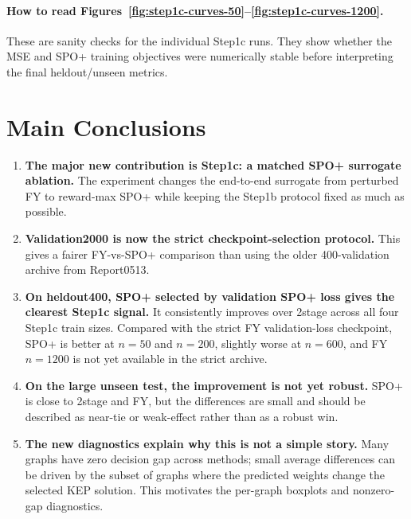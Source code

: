 \documentclass[11pt]{article}
\begin{document}
\paragraph{How to read Figures~\ref{fig:step1c-curves-50}--\ref{fig:step1c-curves-1200}.}
These are sanity checks for the individual Step1c runs. They show whether the
MSE and SPO+ training objectives were numerically stable before interpreting the
final heldout/unseen metrics.

\FloatBarrier
\section{Main Conclusions}

\begin{enumerate}[label=\textbf{C\arabic*.}, leftmargin=2.2em]
    \item \textbf{The major new contribution is Step1c: a matched SPO+ surrogate
    ablation.}  The experiment changes the end-to-end surrogate from perturbed
    FY to reward-max SPO+ while keeping the Step1b protocol fixed as much as
    possible.

    \item \textbf{Validation2000 is now the strict checkpoint-selection
    protocol.}  This gives a fairer FY-vs-SPO+ comparison than using the older
    400-validation archive from Report0513.

    \item \textbf{On heldout400, SPO+ selected by validation SPO+ loss gives the
    clearest Step1c signal.}  It consistently improves over 2stage across all
    four Step1c train sizes. Compared with the strict FY validation-loss
    checkpoint, SPO+ is better at \(n=50\) and \(n=200\), slightly worse at
    \(n=600\), and FY \(n=1200\) is not yet available in the strict archive.

    \item \textbf{On the large unseen test, the improvement is not yet robust.}  SPO+ is
    close to 2stage and FY, but the differences are small and should be
    described as near-tie or weak-effect rather than as a robust win.

    \item \textbf{The new diagnostics explain why this is not a simple story.}
    Many graphs have zero decision gap across methods; small average differences
    can be driven by the subset of graphs where the predicted weights change the
    selected KEP solution. This motivates the per-graph boxplots and nonzero-gap
    diagnostics.
\end{enumerate}
\end{document}
